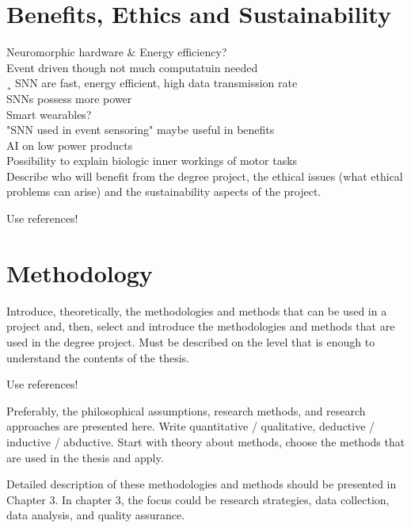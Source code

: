 \section{Benefits, Ethics and Sustainability}
Neuromorphic hardware \& Energy efficiency?\\ Event driven though not much computatuin needed \\¸
SNN are fast, energy efficient, high data transmission rate\\
SNNs possess more power\cite{maass_networks_1997}\\
Smart wearables?\\
"SNN used in event sensoring" maybe useful in benefits\\

AI on low power products\\
Possibility to explain biologic inner workings of motor tasks\\

Describe who will benefit from the degree project, the ethical issues (what ethical problems can arise) and the sustainability aspects of the project.

Use references!

\section{Methodology}
Introduce, theoretically, the methodologies and methods that can be used in a project and, then, select and introduce the methodologies and methods that are used in the degree project. Must be described on the level that is enough to understand the contents of the thesis.

Use references!

Preferably, the philosophical assumptions, research methods, and research approaches are presented here. Write quantitative / qualitative, deductive / inductive / abductive. Start with theory about methods, choose the methods that are used in the thesis and apply.


Detailed description of these methodologies and methods should be presented in Chapter 3. In chapter 3, the focus could be research strategies, data collection, data analysis, and quality assurance.

